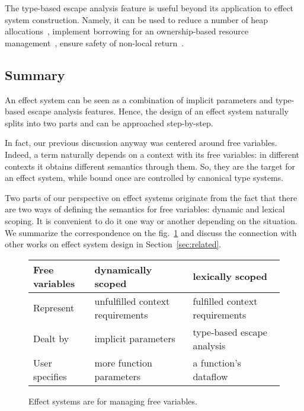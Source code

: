 \documentclass[acmsmall]{acmart}
\begin{document}
The type-based escape analysis feature is useful beyond its application to effect system construction.
Namely, it can be used to reduce a number of heap allocations~\cite{lorenzen2024oxidizing}, implement borrowing for an ownership-based resource management~\cite{matsakis2014rust, lorenzen2024oxidizing}, ensure safety of non-local return~\cite{akhin2021kotlin}.

\subsection{Summary} \label{subsec:idea-summary}

An effect system can be seen as a combination of implicit parameters and type-based escape analysis features.
Hence, the design of an effect system naturally splits into two parts and can be approached step-by-step.

In fact, our previous discussion anyway was centered around free variables.
Indeed, a term naturally depends on a context with its free variables: in different contexts it obtains different semantics through them.
So, they are the target for an effect system, while bound once are controlled by canonical type systems.

Two parts of our perspective on effect systems originate from the fact that there are two ways of defining the semantics for free variables: dynamic and lexical scoping.
It is convenient to do it one way or another depending on the situation.
We summarize the correspondence on the fig.\ \ref{fig:free-vars} and discuss the connection with other works on effect system design in Section\ \ref{sec:related}.

\begin{figure}
    \centering
    \begin{tabular}{|l|l|l|}
        \hline
        Free variables & dynamically scoped & lexically scoped \\
        \hline
        Represent & unfulfilled context requirements & fulfilled context requirements \\
        Dealt by & implicit parameters & type-based escape analysis \\
        User specifies & more function parameters & a function’s dataflow \\
        \hline
    \end{tabular}
    \caption{Effect systems are for managing free variables.}
    \label{fig:free-vars}
\end{figure}
\end{document}
